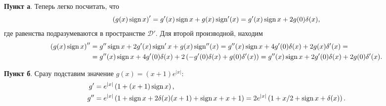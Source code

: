 \textbf{Пункт а}. Теперь легко посчитать, что
\begin{equation*}
    \left(g(x) \mathop{\mathrm{sign}}\nolimits x\right)' = g'(x) \mathop{\mathrm{sign}}\nolimits x + g(x) \mathop{\mathrm{sign}}\nolimits' (x) = g'(x) \mathop{\mathrm{sign}}\nolimits x + 2 g(0) \delta(x),
\end{equation*}
где равенства подразумеваются в пространстве $\mathcal D'$. Для второй производной, находим
\begin{align*}
    \left(g(x) \mathop{\mathrm{sign}}\nolimits x\right)'' &= g'' \mathop{\mathrm{sign}}\nolimits x + 2 g'(x) \mathop{\mathrm{sign}}\nolimits'x + g(x) \mathop{\mathrm{sign}}\nolimits''(x) = 
    g''(x) \mathop{\mathrm{sign}}\nolimits x + 4 g'(0) \delta(x) + 2 g(x) \delta'(x) 
    = \\ &=
    g''(x) \mathop{\mathrm{sign}}\nolimits x + 4 g'(0) \delta(x) + 2\left(
        -g'(0) \delta(x) + g(0) \delta'(x)
    \right) = g''(x) \mathop{\mathrm{sign}}\nolimits x + 2 g'(0) \delta(x) + 2 g(0) \delta'(x).
\end{align*}


\textbf{Пункт б}. Сразу подставим значение $g(x) = (x+1)e^{|x|}$:
\begin{align*}
    g' &= e^{|x|}\left(1+(x+1)\mathop{\mathrm{sign}}\nolimits x \right), \\
    g'' &= 
    e^{|x|} \left(
        1 + \mathop{\mathrm{sign}}\nolimits x + 2 \delta(x) (x+1) + \mathop{\mathrm{sign}}\nolimits x + x + 1
    \right) = 2 e^{|x|} \left(
        1 + x/2 + \mathop{\mathrm{sign}}\nolimits x + \delta(x)
    \right).
\end{align*}